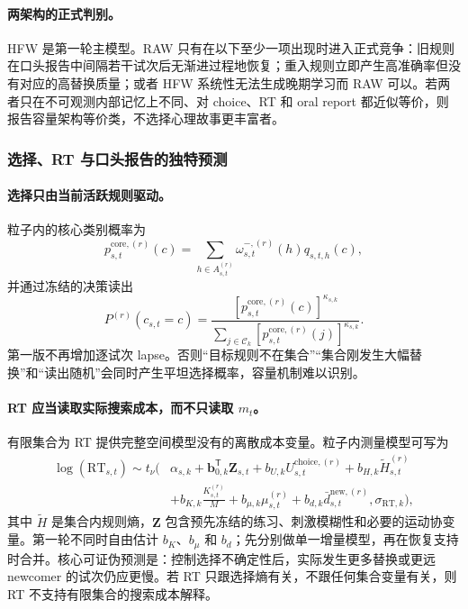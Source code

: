 \paragraph{两架构的正式判别。}
HFW 是第一轮主模型。RAW 只有在以下至少一项出现时进入正式竞争：旧规则在口头报告中间隔若干试次后无渐进过程地恢复；重入规则立即产生高准确率但没有对应的高替换质量；或者 HFW 系统性无法生成晚期学习而 RAW 可以。若两者只在不可观测内部记忆上不同、对 choice、RT 和 oral report 都近似等价，则报告容量架构等价类，不选择心理故事更丰富者。


\subsubsection{选择、RT 与口头报告的独特预测}

\paragraph{选择只由当前活跃规则驱动。}
粒子内的核心类别概率为
\begin{equation}
    p^{\mathrm{core},(r)}_{s,t}(c)
    =\sum_{h\in A^{(r)}_{s,t}}
      \omega^{-,(r)}_{s,t}(h)q_{s,t,h}(c),
    \label{eq:model0804-particle-core-choice}
\end{equation}
并通过冻结的决策读出
\begin{equation}
    P^{(r)}(c_{s,t}=c)
    =\frac{[p^{\mathrm{core},(r)}_{s,t}(c)]^{\kappa_{s,k}}}
    {\sum_{j\in\mathcal C_k}
     [p^{\mathrm{core},(r)}_{s,t}(j)]^{\kappa_{s,k}}}.
    \label{eq:model0804-particle-choice}
\end{equation}
第一版不再增加逐试次 lapse。否则“目标规则不在集合”“集合刚发生大幅替换”和“读出随机”会同时产生平坦选择概率，容量机制难以识别。

\paragraph{RT 应当读取实际搜索成本，而不只读取 $m_t$。}
有限集合为 RT 提供完整空间模型没有的离散成本变量。粒子内测量模型可写为
\begin{align}
    \log(\mathrm{RT}_{s,t})\sim t_\nu\!\Big(&
      \alpha_{s,k}+\mathbf b_{0,k}^{\mathsf T}\mathbf Z_{s,t}
      +b_{U,k}U^{\mathrm{choice},(r)}_{s,t}
      +b_{H,k}\widetilde H^{(r)}_{s,t}\nonumber\\
      &+b_{K,k}\frac{K^{(r)}_{s,t}}{M}
      +b_{\mu,k}\mu^{(r)}_{s,t}
      +b_{d,k}\bar d^{\mathrm{new},(r)}_{s,t},
      \sigma_{\mathrm{RT},k}\Big),
    \label{eq:model0804-rt-channel}
\end{align}
其中 $\widetilde H$ 是集合内规则熵，$\mathbf Z$ 包含预先冻结的练习、刺激模糊性和必要的运动协变量。第一轮不同时自由估计 $b_K$、$b_\mu$ 和 $b_d$；先分别做单一增量模型，再在恢复支持时合并。核心可证伪预测是：控制选择不确定性后，实际发生更多替换或更远 newcomer 的试次仍应更慢。若 RT 只跟选择熵有关，不跟任何集合变量有关，则 RT 不支持有限集合的搜索成本解释。

